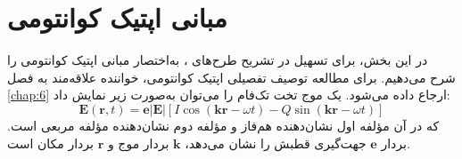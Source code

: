 \section{مبانی اپتیک کوانتومی}
\label{sec:7-5}
در این بخش، برای تسهیل در تشریح طرح‌های ، به‌اختصار مبانی اپتیک کوانتومی \cite{7-7, 7-30, 7-78, 7-79, 7-80} را شرح می‌دهیم. برای مطالعه توصیف تفصیلی اپتیک کوانتومی، خواننده علاقه‌مند به فصل \ref{chap:6} ارجاع داده می‌شود. یک موج تخت تک‌فام را می‌توان به‌صورت زیر نمایش داد:
\begin{equation}
	\bm{E}(\bm{r}, t) = \bm{e} |\bm{E}| [I \cos(\bm{k}\bm{r} - \omega t) - Q \sin(\bm{k}\bm{r} - \omega t)]
	\label{eq:7-67}
\end{equation}
که در آن مؤلفه اول نشان‌دهنده هم‌فاز و مؤلفه دوم نشان‌دهنده مؤلفه مربعی است. بردار $\bm{e}$ جهت‌گیری قطبش را نشان می‌دهد، $\bm{k}$ بردار موج و $\bm{r}$ بردار مکان است.


